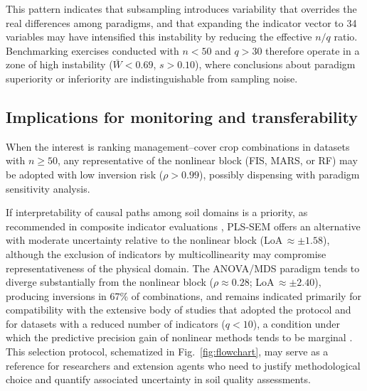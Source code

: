 \documentclass[pdflatex,sn-basic]{sn-jnl}%
\begin{document}
This pattern indicates that subsampling introduces variability that overrides the real differences among paradigms, and that expanding the indicator vector to 34 variables may have intensified this instability by reducing the effective $n/q$ ratio. Benchmarking exercises conducted with $n < 50$ and $q > 30$ therefore operate in a zone of high instability ($\bar{W} < 0.69$, $s > 0.10$), where conclusions about paradigm superiority or inferiority are indistinguishable from sampling noise.

\subsection{Implications for monitoring and transferability}\label{subsec:implications}

When the interest is ranking management--cover crop combinations in datasets with $n \geq 50$, any representative of the nonlinear block (FIS, MARS, or RF) may be adopted with low inversion risk ($\rho > 0.99$), possibly dispensing with paradigm sensitivity analysis.

If interpretability of causal paths among soil domains is a priority, as recommended in composite indicator evaluations \citep{Cardoso2013}, PLS-SEM offers an alternative with moderate uncertainty relative to the nonlinear block (LoA\,$\approx \pm 1.58$), although the exclusion of indicators by multicollinearity may compromise representativeness of the physical domain. The ANOVA/MDS paradigm tends to diverge substantially from the nonlinear block ($\rho \approx 0.28$; LoA\,$\approx \pm 2.40$), producing inversions in 67\% of combinations, and remains indicated primarily for compatibility with the extensive body of studies that adopted the \cite{Andrews2002} protocol and for datasets with a reduced number of indicators ($q < 10$), a condition under which the predictive precision gain of nonlinear methods tends to be marginal \citep{Bunemann2018}. This selection protocol, schematized in Fig.~\ref{fig:flowchart}, may serve as a reference for researchers and extension agents who need to justify methodological choice and quantify associated uncertainty in soil quality assessments.
\end{document}

